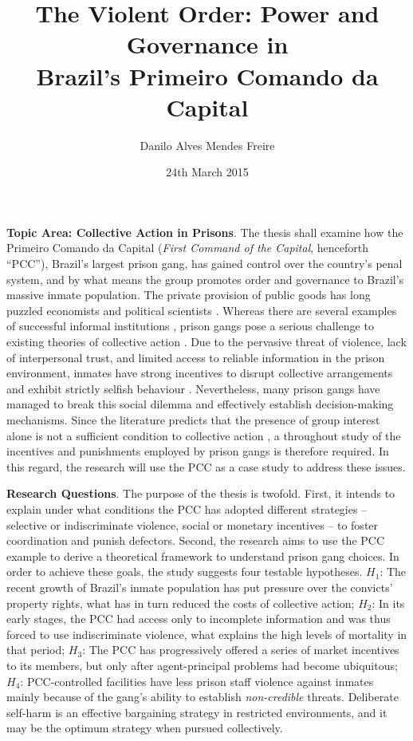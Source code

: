 \documentclass[a4paper,11pt]{article}
\title{The Violent Order: Power and Governance in\\ Brazil's Primeiro Comando da Capital}
\author{Danilo Alves Mendes Freire}
\date{24th March 2015}
\begin{document}
\maketitle

\singlespacing

\noindent \textbf{Topic Area: Collective Action in Prisons}. The thesis shall examine how the Primeiro Comando da Capital (\textit{First Command of the Capital}, henceforth ``PCC''), Brazil's largest prison gang, has gained control over the country's penal system, and by what means the group promotes order and governance to Brazil's massive inmate population. The private provision of public goods has long puzzled economists and political scientists \citep{hayek1960constitution, olson1965logic, ostrom1990governing}. Whereas there are several examples of successful informal institutions \citep{helmke2004informal}, prison gangs pose a serious challenge to existing theories of collective action \citep{sheptycki2003governance, skarbek2011governance, skarbek2014social}. Due to the pervasive threat of violence, lack of interpersonal trust, and limited access to reliable information in the prison environment, inmates have strong incentives to disrupt collective arrangements and exhibit strictly selfish behaviour \citep{gambetta2009codes, liebling2012social}. Nevertheless, many prison gangs have managed to break this social dilemma and effectively establish decision-making mechanisms. Since the literature predicts that the presence of group interest alone is not a sufficient condition to collective action \citep{marx2012achtzehnte, olson1965logic}, a throughout study of the incentives and punishments employed by prison gangs is therefore required. In this regard, the research will use the PCC as a case study to address these issues.

\vspace{.45cm}

\noindent \textbf{Research Questions}. The purpose of the thesis is twofold. First, it intends to explain under what conditions the PCC has adopted different strategies -- selective or indiscriminate violence, social or monetary incentives -- to foster coordination and punish defectors. Second, the research aims to use the PCC example to derive a theoretical framework to understand prison gang choices. In order to achieve these goals, the study suggests four testable hypotheses. $H_1$: The recent growth of Brazil's inmate population has put pressure over the convicts' property rights, what has in turn reduced the costs of collective action; $H_2$: In its early stages, the PCC had access only to incomplete information and was thus forced to use indiscriminate violence, what explains the high levels of mortality in that period; $H_3$: The PCC has progressively offered a series of market incentives to its members, but only after agent-principal problems had become ubiquitous; $H_4$: PCC-controlled facilities have less prison staff violence against inmates mainly because of the gang's ability to establish \textit{non-credible} threats. Deliberate self-harm is an effective bargaining strategy in restricted environments, and it may be the optimum strategy when pursued collectively.
\end{document}
